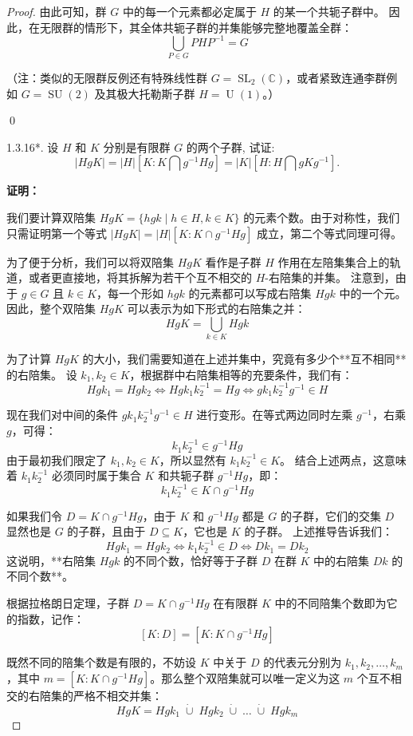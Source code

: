 \documentclass[]{article}
\begin{document}
\begin{proof}
由此可知，群 $G$ 中的每一个元素都必定属于 $H$ 的某一个共轭子群中。
因此，在无限群的情形下，其全体共轭子群的并集能够完整地覆盖全群：
\[ \bigcup_{P \in G} P H P^{-1} = G \]

（注：类似的无限群反例还有特殊线性群 $G = \operatorname{SL}_2(\mathbb{C})$，或者紧致连通李群例如 $G = \operatorname{SU}(2)$ 及其极大托勒斯子群 $H = \operatorname{U}(1)$。）

\qed

1.3.16*. 设 $H$ 和 $K$ 分别是有限群 $G$ 的两个子群, 试证: $$
| H g K | = | H | [ K: K \bigcap g ^ {- 1} H g ] = | K | [ H: H \bigcap g K g ^ {- 1} ].
$$

\bigskip
\noindent \textbf{证明：} 

我们要计算双陪集 $HgK = \{ hgk \mid h \in H, k \in K \}$ 的元素个数。由于对称性，我们只需证明第一个等式 $|HgK| = |H| [K: K \cap g^{-1}Hg]$ 成立，第二个等式同理可得。

\bigskip
为了便于分析，我们可以将双陪集 $HgK$ 看作是子群 $H$ 作用在左陪集集合上的轨道，或者更直接地，将其拆解为若干个互不相交的 $H$-右陪集的并集。
注意到，由于 $g \in G$ 且 $k \in K$，每一个形如 $hgk$ 的元素都可以写成右陪集 $Hgk$ 中的一个元。因此，整个双陪集 $HgK$ 可以表示为如下形式的右陪集之并：
\[ HgK = \bigcup_{k \in K} Hgk \]

为了计算 $HgK$ 的大小，我们需要知道在上述并集中，究竟有多少个**互不相同**的右陪集。
设 $k_1, k_2 \in K$，根据群中右陪集相等的充要条件，我们有：
\[ Hgk_1 = Hgk_2 \iff Hgk_1 k_2^{-1} = Hg \iff g k_1 k_2^{-1} g^{-1} \in H \]

现在我们对中间的条件 $g k_1 k_2^{-1} g^{-1} \in H$ 进行变形。在等式两边同时左乘 $g^{-1}$，右乘 $g$，可得：
\[ k_1 k_2^{-1} \in g^{-1}Hg \]
由于最初我们限定了 $k_1, k_2 \in K$，所以显然有 $k_1 k_2^{-1} \in K$。
结合上述两点，这意味着 $k_1 k_2^{-1}$ 必须同时属于集合 $K$ 和共轭子群 $g^{-1}Hg$，即：
\[ k_1 k_2^{-1} \in K \cap g^{-1}Hg \]

如果我们令 $D = K \cap g^{-1}Hg$，由于 $K$ 和 $g^{-1}Hg$ 都是 $G$ 的子群，它们的交集 $D$ 显然也是 $G$ 的子群，且由于 $D \subseteq K$，它也是 $K$ 的子群。
上述推导告诉我们：
\[ Hgk_1 = Hgk_2 \iff k_1 k_2^{-1} \in D \iff Dk_1 = Dk_2 \]
这说明，**右陪集 $Hgk$ 的不同个数，恰好等于子群 $D$ 在群 $K$ 中的右陪集 $Dk$ 的不同个数**。

根据拉格朗日定理，子群 $D = K \cap g^{-1}Hg$ 在有限群 $K$ 中的不同陪集个数即为它的指数，记作：
\[ [K : D] = [K : K \cap g^{-1}Hg] \]

既然不同的陪集个数是有限的，不妨设 $K$ 中关于 $D$ 的代表元分别为 $k_1, k_2, \dots, k_m$，其中 $m = [K: K \cap g^{-1}Hg]$。那么整个双陪集就可以唯一定义为这 $m$ 个互不相交的右陪集的严格不相交并集：
\[ HgK = Hgk_1 \;\dot{\cup}\; Hgk_2 \;\dot{\cup}\; \dots \;\dot{\cup}\; Hgk_m \]


\end{proof}
\end{document}
